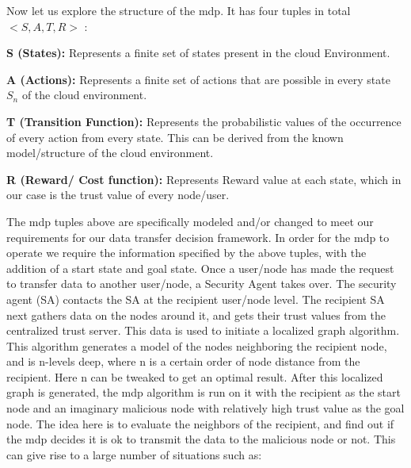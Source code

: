 Now let us explore the structure of the \gls{mdp}. It
has four tuples in total $< S, A, T, R >$ \autocite{QimingHe2000}:
\begin{description}
    \item{\textbf{S (States):}} Represents a finite set of states present in the cloud Environment.
    \item{\textbf{A (Actions):}} Represents a finite set of actions that are possible in
        every state $S_n$ of the cloud environment.
    \item{\textbf{T (Transition Function):}} Represents the probabilistic values of the occurrence of every action from every state. This can be derived from the known model/structure of the cloud environment.
    \item{\textbf{R (Reward/ Cost function):}} Represents Reward value at each state, which
    in our case is the trust value of every node/user.  
\end{description}
The \gls{mdp} tuples above are
specifically modeled and/or changed to meet our requirements for our data
transfer decision framework. In order for the \gls{mdp} to operate we require the
information specified by the above tuples, with the addition of a start
state and goal state. Once a user/node has made the request to transfer data
to another user/node, a Security Agent takes over. The security agent (SA)
contacts the SA at the recipient user/node level. The recipient SA next
gathers data on the nodes around it, and gets their trust values from the
centralized trust server. This data is used to initiate a localized graph
algorithm. This algorithm generates a model of the nodes neighboring the
recipient node, and is n-levels deep, where n is a certain order of node
distance from the recipient. Here n can be tweaked to get an optimal result.
After this localized graph is generated, the \gls{mdp} algorithm is run on it with
the recipient as the start node and an imaginary malicious node with
relatively high trust value as the goal node. The idea here is to evaluate
the neighbors of the recipient, and find out if the \gls{mdp} decides it is ok to
transmit the data to the malicious node or not. This can give rise to
a large number of situations such as:
